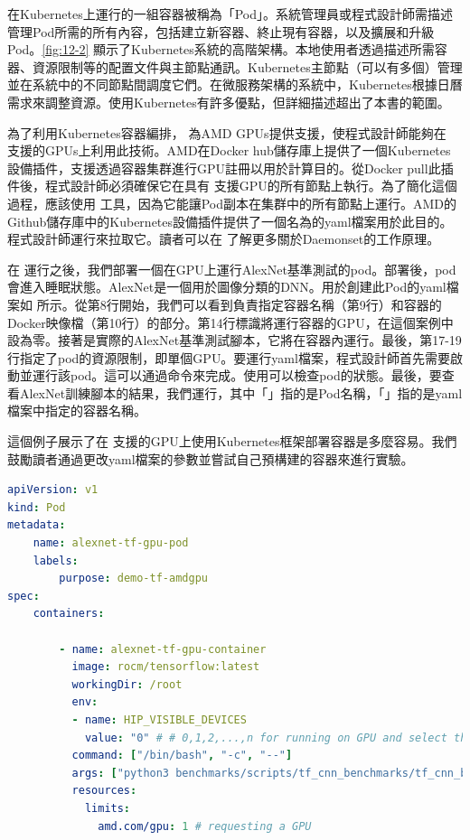 在Kubernetes上運行的一組容器被稱為「Pod」。系統管理員或程式設計師需描述管理Pod所需的所有內容，包括建立新容器、終止現有容器，以及擴展和升級Pod。\autoref{fig:12-2} 顯示了Kubernetes系統的高階架構。本地使用者透過描述所需容器、資源限制等的配置文件與主節點通訊。Kubernetes主節點（可以有多個）管理並在系統中的不同節點間調度它們。在微服務架構的系統中，Kubernetes根據日曆需求來調整資源。使用Kubernetes有許多優點，但詳細描述超出了本書的範圍。

為了利用Kubernetes容器編排， 為AMD GPUs提供支援，使程式設計師能夠在  支援的GPUs上利用此技術。AMD在Docker hub儲存庫上提供了一個Kubernetes設備插件，支援透過容器集群進行GPU註冊以用於計算目的。從Docker pull此插件後，程式設計師必須確保它在具有  支援GPU的所有節點上執行。為了簡化這個過程，應該使用  工具，因為它能讓Pod副本在集群中的所有節點上運行。AMD的Github儲存庫中的Kubernetes設備插件提供了一個名為的yaml檔案用於此目的。程式設計師運行來拉取它。讀者可以在 \cite{Kubernetes-Documentation} 了解更多關於Daemonset的工作原理。

在  運行之後，我們部署一個在GPU上運行AlexNet基準測試的pod。部署後，pod會進入睡眠狀態。AlexNet是一個用於圖像分類的DNN。用於創建此Pod的yaml檔案如  所示。從第8行開始，我們可以看到負責指定容器名稱（第9行）和容器的Docker映像檔（第10行）的部分。第14行標識將運行容器的GPU，在這個案例中設為零。接著是實際的AlexNet基準測試腳本，它將在容器內運行。最後，第17-19行指定了pod的資源限制，即單個GPU。要運行yaml檔案，程式設計師首先需要啟動並運行該pod。這可以通過命令來完成。使用可以檢查pod的狀態。最後，要查看AlexNet訓練腳本的結果，我們運行，其中「」指的是Pod名稱，「」指的是yaml檔案中指定的容器名稱。

這個例子展示了在  支援的GPU上使用Kubernetes框架部署容器是多麼容易。我們鼓勵讀者通過更改yaml檔案的參數並嘗試自己預構建的容器來進行實驗。

\begin{lstlisting}[language=yaml, caption={在Kubernetes平台上執行AlexNet基準測試的配置文件}, captionpos=t, label={lst:config_file+exe_alexnetink8s}]
apiVersion: v1
kind: Pod
metadata:
    name: alexnet-tf-gpu-pod
    labels:
        purpose: demo-tf-amdgpu
spec:
    containers:

        - name: alexnet-tf-gpu-container
          image: rocm/tensorflow:latest
          workingDir: /root
          env:
          - name: HIP_VISIBLE_DEVICES
            value: "0" # # 0,1,2,...,n for running on GPU and select the GPUs, -1 for running on CPU
          command: ["/bin/bash", "-c", "--"]
          args: ["python3 benchmarks/scripts/tf_cnn_benchmarks/tf_cnn_benchmarks.py --model=alexnet; trap : TERM INT; sleep infinity & wait"]
          resources:
            limits:
              amd.com/gpu: 1 # requesting a GPU
\end{lstlisting}

